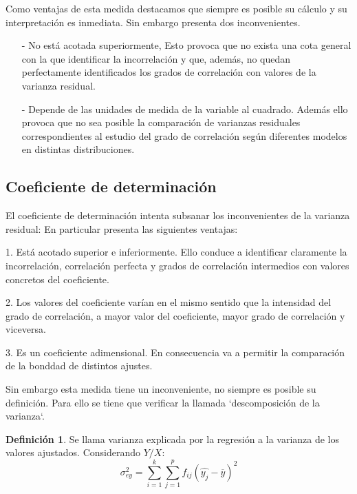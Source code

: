 \documentclass{article}
\theoremstyle{definition}
\newtheorem{definition}{Definición}[section]
\begin{document}
Como ventajas de esta medida destacamos que siempre es posible su cálculo y su
interpretación es inmediata. Sin embargo presenta dos inconvenientes.

\begin{itemize}
    \item[-] No está acotada superiormente, Esto provoca que no exista una cota general con la que identificar la incorrelación y que, además, no quedan perfectamente identificados los grados de correlación con valores de la varianza residual.
    \item[-] Depende de las unidades de medida de la variable al cuadrado. Además ello provoca que no sea posible la comparación de varianzas residuales correspondientes al estudio del grado de correlación según diferentes modelos en distintas distribuciones.
\end{itemize}
\subsection{Coeficiente de determinación}

	El coeficiente de determinación intenta subsanar los inconvenientes de la
	varianza residual: En particular presenta las siguientes ventajas:
	\vspace{2mm}

	1. Está acotado superior e inferiormente. Ello conduce a identificar
	claramente la incorrelación, correlación perfecta y grados de correlación
	intermedios con valores concretos del coeficiente.

	\vspace{2mm}

	2. Los valores del coeficiente varían en el mismo sentido que la intensidad del
	grado de correlación, a mayor valor del coeficiente, mayor grado de
	correlación y viceversa.

	\vspace{2mm}

	3. Es un coeficiente adimensional. En consecuencia va a permitir la
	comparación de la bonddad de distintos ajustes.

	\vspace{2mm}

	Sin embargo esta medida tiene un inconveniente, no siempre es posible su
	definición. Para ello se tiene que verificar la llamada `descomposición de la
	varianza`.

	\begin{definition}
		Se llama varianza explicada por la regresión a la varianza de los
		valores ajustados. Considerando $Y/X$:
		$$
		\sigma_{ey}^2 = \sum_{i=1}^k\sum_{j=1}^p f_{ij}(\hat{y_j}-\overline{y})^2
		$$
	\end{definition}
\end{document}

